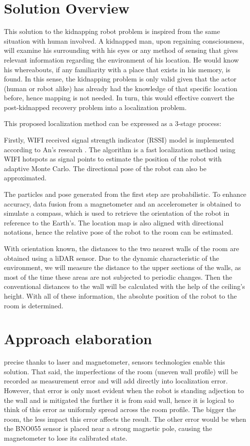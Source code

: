 \documentclass[sigconf, nonacm]{acmart}
\begin{document}
\section{Solution Overview}

This solution to the kidnapping robot problem is inspired from the same situation with human involved. A kidnapped man, upon regaining consciousness, will examine his surrounding with his eyes or any method of sensing that gives relevant information regarding the environment of his location. He would know his whereabouts, if any familiarity with a place that exists in his memory, is found. In this sense, the kidnapping problem is only valid given that the actor (human or robot alike) has already had the knowledge of that specific location before, hence mapping is not needed. In turn, this would effective convert the post-kidnapped recovery problem into a localization problem.

This proposed localization method can be expressed as a 3-stage process:

Firstly, WIFI received signal strength indicator (RSSI) model is implemented according to An’s research   . The algorithm is a fast localization method using WIFI hotspots as signal points to estimate the position of the robot with adaptive Monte Carlo. The directional pose of the robot can also be approximated. 

The particles and pose generated from the first step are probabilistic. To enhance accuracy, data fusion from a magnetometer and an accelerometer is obtained to simulate a compass, which is used to retrieve the orientation of the robot in reference to the Earth's. The location map is also aligned with directional notations, hence the relative pose of the robot to the room can be estimated.

With orientation known, the distances to the two nearest walls of the room are obtained using a liDAR sensor. Due to the dynamic characteristic of the environment, we will measure the distance to the upper sections of the walls, as most of the time these areas are not subjected to periodic changes. Then the conventional distances to the wall will be calculated with the help of the ceiling's height. With all of these information, the absolute position of the robot to the room is determined.

\section{Approach elaboration}
precise thanks to laser and magnetometer, sensors technologies enable this solution. That said, the imperfections of the room (uneven wall profile) will be recorded as measurement error and will add directly into localization error. However, that error is only most evident when the robot is standing adjection to the wall and is mitigated the further it is from said wall, hence it is logical to think of this error as uniformly spread across the room profile. The bigger the room, the less impact this error affects the result. The other error would be when the BNO055 sensor is placed near a strong magnetic pole, causing the magnetometer to lose its calibrated state.
\end{document}
